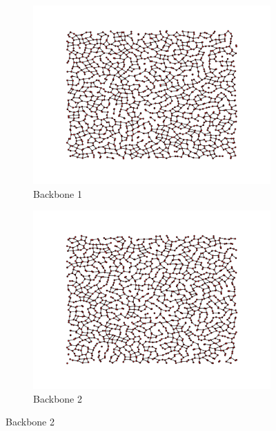 \documentclass[oneside, titlepage]{scrartcl}
\begin{document}
\begin{figure}[!h]
\begin{subfigure}{0.5\textwidth}
	\centering
	\includegraphics[width=0.9\linewidth]{figures/simplegraph4.pdf}
	\caption{Backbone 1}
\end{subfigure}%
\begin{subfigure}{0.5\textwidth}
	\centering
	\includegraphics[width=0.9\linewidth]{figures/simplegraph41.pdf}
	\caption{Backbone 2}
\end{subfigure}
\end{figure}
\end{document}
